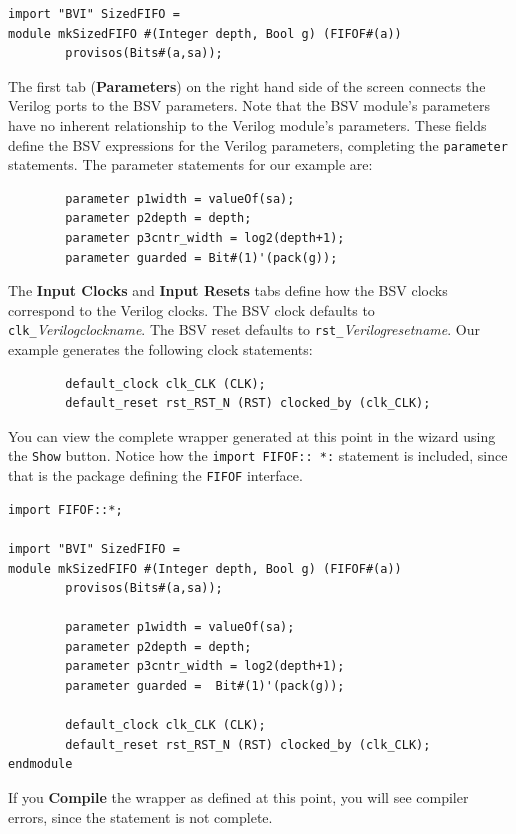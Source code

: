 \documentclass{article}
\newcommand{\te}[1]{\texttt{#1}}
\begin{document}
\begin{verbatim}
import "BVI" SizedFIFO =
module mkSizedFIFO #(Integer depth, Bool g) (FIFOF#(a))
        provisos(Bits#(a,sa));
\end{verbatim}


The first tab ({\bf Parameters}) on the right hand side of the screen
connects the Verilog ports to the BSV parameters. Note that the BSV
module's parameters have no inherent relationship to the Verilog
module's parameters.  These fields  define the BSV expressions for
the Verilog parameters, completing the \te{parameter} statements. The
parameter statements for our example are:

\begin{verbatim}
        parameter p1width = valueOf(sa);
        parameter p2depth = depth;
        parameter p3cntr_width = log2(depth+1);
        parameter guarded = Bit#(1)'(pack(g));
\end{verbatim}

The {\bf Input Clocks} and {\bf Input Resets} tabs define how the BSV
clocks correspond to the Verilog clocks.  The BSV clock defaults to
\te{clk\_}{\em Verilogclockname}.  The BSV reset defaults to
\te{rst\_}{\em Verilogresetname}.    Our example generates the
following clock statements:
\begin{verbatim}
        default_clock clk_CLK (CLK);
        default_reset rst_RST_N (RST) clocked_by (clk_CLK);
\end{verbatim}

You can view the complete wrapper generated at this
point in the wizard   using the \te{Show} button.  Notice how the
\te{import FIFOF:: *:} statement is included, since that is the
package defining the \te{FIFOF} interface.
\begin{verbatim}
import FIFOF::*;

import "BVI" SizedFIFO =
module mkSizedFIFO #(Integer depth, Bool g) (FIFOF#(a))
        provisos(Bits#(a,sa));

        parameter p1width = valueOf(sa);
        parameter p2depth = depth;
        parameter p3cntr_width = log2(depth+1);
        parameter guarded =  Bit#(1)'(pack(g));

        default_clock clk_CLK (CLK);
        default_reset rst_RST_N (RST) clocked_by (clk_CLK);
endmodule
\end{verbatim}

If you {\bf Compile} the wrapper as defined at this point, you will
see compiler errors, since the statement is not complete.
\end{document}
